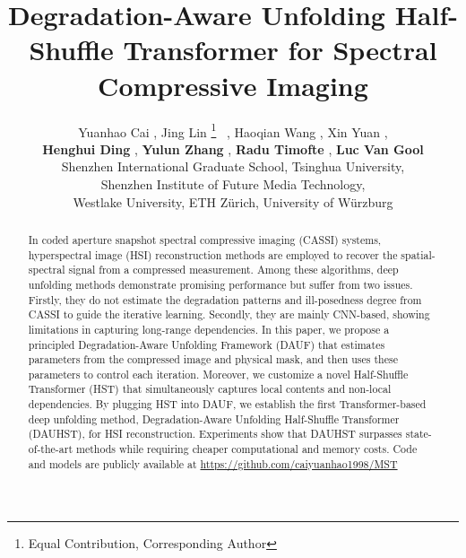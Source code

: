 \documentclass{article}
\title{Degradation-Aware Unfolding Half-Shuffle Transformer  for  Spectral Compressive Imaging}
\author{Yuanhao Cai , Jing Lin \thanks{Equal Contribution,  Corresponding Author} ~, Haoqian Wang , Xin Yuan , \\ \textbf{Henghui Ding} , \textbf{Yulun Zhang} , \textbf{Radu Timofte} ,  \textbf{Luc Van Gool}  \\
	 Shenzhen International Graduate School, Tsinghua University, \\   Shenzhen Institute of Future Media Technology, \\  Westlake University,  ETH Z\"{u}rich,  University of W\"urzburg
}
\begin{document}
\maketitle

\vspace{-5.5mm}
\begin{abstract}
	\vspace{-3mm}
	In coded aperture snapshot spectral compressive imaging (CASSI) systems, hyperspectral image (HSI) reconstruction methods are employed to recover the spatial-spectral signal from a compressed measurement. Among these algorithms, deep unfolding methods demonstrate promising performance but suffer from two issues. Firstly, they do not estimate the degradation patterns and ill-posedness degree from CASSI to guide the iterative learning. Secondly, they are mainly CNN-based, showing limitations in capturing long-range dependencies. In this paper, we propose a  principled Degradation-Aware Unfolding Framework (DAUF) that estimates parameters from the compressed image and physical mask, and then uses these parameters to control each iteration. Moreover,  we customize a novel Half-Shuffle Transformer (HST) that simultaneously captures local contents and non-local dependencies. By plugging HST into DAUF, we establish the first Transformer-based deep unfolding method, Degradation-Aware  Unfolding Half-Shuffle Transformer (DAUHST), for HSI reconstruction. Experiments show that DAUHST surpasses state-of-the-art methods while requiring cheaper computational and memory costs. Code and models are publicly available at   \url{https://github.com/caiyuanhao1998/MST}
\end{abstract}

\vspace{-1mm}
\end{document}
